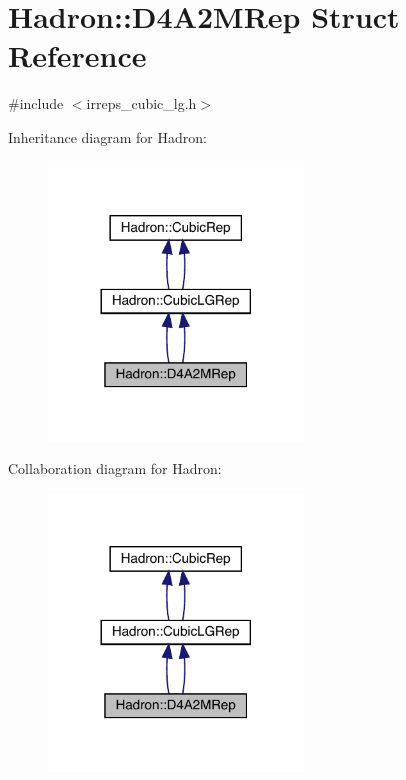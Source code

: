 \hypertarget{structHadron_1_1D4A2MRep}{}\section{Hadron\+:\+:D4\+A2\+M\+Rep Struct Reference}
\label{structHadron_1_1D4A2MRep}


{\ttfamily \#include $<$irreps\+\_\+cubic\+\_\+lg.\+h$>$}



Inheritance diagram for Hadron\+:\nopagebreak
\begin{figure}[H]
\begin{center}
\leavevmode
\includegraphics[width=192pt]{d7/d19/structHadron_1_1D4A2MRep__inherit__graph}
\end{center}
\end{figure}


Collaboration diagram for Hadron\+:\nopagebreak
\begin{figure}[H]
\begin{center}
\leavevmode
\includegraphics[width=192pt]{d4/d54/structHadron_1_1D4A2MRep__coll__graph}
\end{center}
\end{figure}
